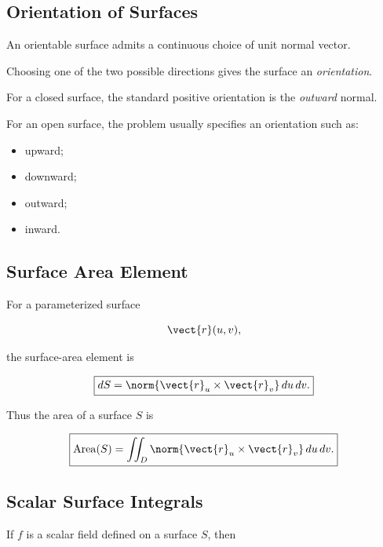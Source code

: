 \subsection{Orientation of Surfaces}
\label{subsec:surface-orientation}

An orientable surface admits a continuous choice of unit normal vector.

Choosing one of the two possible directions gives the surface an
\emph{orientation}.

For a closed surface, the standard positive orientation is the
\emph{outward} normal.

For an open surface, the problem usually specifies an orientation such as:

\begin{itemize}
    \item upward;
    \item downward;
    \item outward;
    \item inward.
\end{itemize}

\subsection{Surface Area Element}
\label{subsec:surface-area-element}

For a parameterized surface

\[ \vect{r}(u,v), \]

the surface-area element is

\[ \boxed{
dS
=
\norm{\vect{r}_u\times\vect{r}_v}\,du\,dv.
} \]

Thus the area of a surface \(S\) is

\[ \boxed{
\operatorname{Area}(S)
=
\iint_D
\norm{\vect{r}_u\times\vect{r}_v}\,du\,dv.
} \]

\subsection{Scalar Surface Integrals}
\label{subsec:scalar-surface-integrals}

If \(f\) is a scalar field defined on a surface \(S\), then

